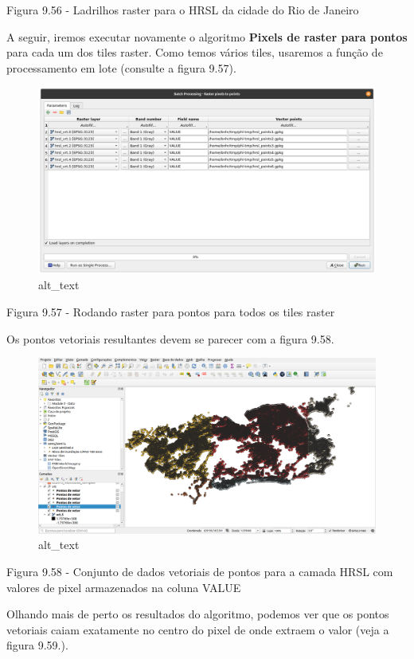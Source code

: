 \documentclass[
]{book}
\begin{document}
Figura 9.56 - Ladrilhos raster para o HRSL da cidade do Rio de Janeiro

A seguir, iremos executar novamente o algoritmo \textbf{Pixels de raster para pontos} para cada um dos tiles raster. Como temos vários tiles, usaremos a função de processamento em lote (consulte a figura 9.57).

\begin{figure}
\centering
\includegraphics{media/modulo9/fig957.png}
\caption{alt\_text}
\end{figure}

Figura 9.57 - Rodando raster para pontos para todos os tiles raster

Os pontos vetoriais resultantes devem se parecer com a figura 9.58.

\begin{figure}
\centering
\includegraphics{media/modulo9/fig958.png}
\caption{alt\_text}
\end{figure}

Figura 9.58 - Conjunto de dados vetoriais de pontos para a camada HRSL com valores de pixel armazenados na coluna VALUE

Olhando mais de perto os resultados do algoritmo, podemos ver que os pontos vetoriais caiam exatamente no centro do pixel de onde extraem o valor (veja a figura 9.59.).
\end{document}
